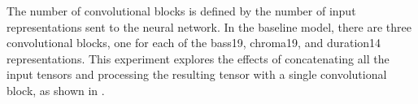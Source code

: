 
The number of convolutional blocks is defined by the number
of input representations sent to the neural network. In the
baseline model, there are three convolutional blocks, one
for each of the \gls{bass19}, \gls{chroma19}, and
\gls{duration14} representations. This experiment explores
the effects of concatenating all the input tensors and
processing the resulting tensor with a single convolutional
block, as shown in .

